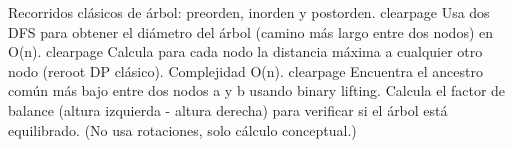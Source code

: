 \markdownRendererDocumentBegin
\markdownRendererSectionBegin
{}\markdownRendererInterblockSeparator
{}\markdownRendererParagraphSeparator
{}\markdownRendererSectionBegin
{}\markdownRendererInterblockSeparator
{}Recorridos clásicos de árbol: preorden, inorden y postorden.\markdownRendererInterblockSeparator
{}\markdownRendererInterblockSeparator
{}\markdownRendererDollarSign{}\markdownRendererBackslash{}clearpage\markdownRendererDollarSign{}\markdownRendererInterblockSeparator
{}
\markdownRendererSectionEnd 
\markdownRendererSectionEnd \markdownRendererSectionBegin
{}\markdownRendererInterblockSeparator
{}Usa dos DFS para obtener el diámetro del árbol (camino más largo entre dos nodos) en O(n).\markdownRendererInterblockSeparator
{}\markdownRendererInterblockSeparator
{}\markdownRendererDollarSign{}\markdownRendererBackslash{}clearpage\markdownRendererDollarSign{}\markdownRendererInterblockSeparator
{}\markdownRendererSectionBegin
{}\markdownRendererInterblockSeparator
{}Calcula para cada nodo la distancia máxima a cualquier otro nodo (reroot DP clásico). Complejidad O(n).\markdownRendererInterblockSeparator
{}\markdownRendererInterblockSeparator
{}\markdownRendererDollarSign{}\markdownRendererBackslash{}clearpage\markdownRendererDollarSign{}\markdownRendererInterblockSeparator
{}
\markdownRendererSectionEnd \markdownRendererSectionBegin
{}\markdownRendererInterblockSeparator
{}Encuentra el ancestro común más bajo entre dos nodos a y b usando binary lifting.\markdownRendererInterblockSeparator
{}\markdownRendererInterblockSeparator
{}
\markdownRendererSectionEnd \markdownRendererSectionBegin
{}\markdownRendererInterblockSeparator
{}Calcula el factor de balance (altura izquierda - altura derecha) para verificar si el árbol está equilibrado.\markdownRendererSoftLineBreak
{}(No usa rotaciones, solo cálculo conceptual.)\markdownRendererInterblockSeparator
{}
\markdownRendererSectionEnd 
\markdownRendererSectionEnd \markdownRendererDocumentEnd